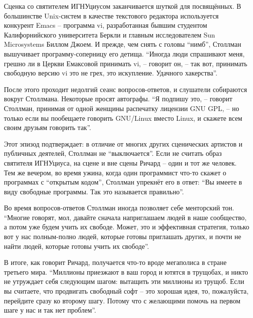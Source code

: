 Сценка со святителем ИГНУциусом заканчивается шуткой для посвящённых. В большинстве Unix-систем в качестве текстового редактора используется конкурент Emacs -- программа vi, разработанная бывшим студентом Калифорнийского университета Беркли и главным исследователем Sun Microsystems Биллом Джоем. И прежде, чем снять с головы \enquote{нимб}, Столлман вышучивает программу-соперницу его детища. \enquote{Иногда люди спрашивают меня, грешно ли в Церкви Емаксовой принимать vi, -- говорит он, -- так вот, принимать свободную версию vi это не грех, это искупление. Удачного хакерства}. 

После этого проходит недолгий сеанс вопросов-ответов, и слушатели собираются вокруг Столлмана. Некоторые просят автографы. \enquote{Я подпишу это, -- говорит Столлман, принимая от одной женщины распечатку лицензии GNU GPL, -- но только если вы пообещаете говорить GNU/Linux вместо Linux, и скажете всем своим друзьям говорить так}.

Этот эпизод подтверждает: в отличие от многих других сценических артистов и публичных деятелей, Столлман не \enquote{выключается}. Если не считать образ святителя ИГНУциуса, на сцене и вне сцены Ричард -- один и тот же человек. Тем же вечером, во время ужина, когда один программист что-то скажет о программах с \enquote{открытым кодом}, Столлман упрекнёт его в ответ: \enquote{Вы имеете в виду свободные программы. Так это называется правильно}.

Во время вопросов-ответов Столлман иногда позволяет себе менторский тон. \enquote{Многие говорят, мол, давайте сначала наприглашаем людей в наше сообщество, а потом уже будем учить их свободе. Может, это и эффективная стратегия, только вот у нас полным-полно людей, которые готовы приглашать других, и почти не найти людей, которые готовы учить их свободе}.

В итоге, как говорит Ричард, получается что-то вроде мегаполиса в стране третьего мира. \enquote{Миллионы приезжают в ваш город и ютятся в трущобах, и никто не утруждает себя следующим шагом: вытащить эти миллионы из трущоб. Если вы считаете, что продвигать свободный софт -- это хорошая идея, то, пожалуйста, перейдите сразу ко второму шагу. Потому что с желающими помочь на первом шаге у нас и так нет проблем}.

